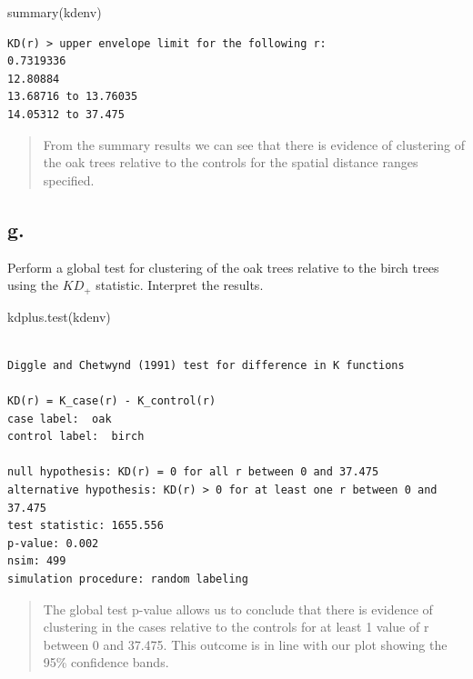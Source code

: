 \documentclass[
  letterpaper,
  DIV=11,
  numbers=noendperiod]{scrartcl}
\newenvironment{Shaded}{\begin{snugshade}}{\end{snugshade}}
\newcommand{\FunctionTok}[1]{\textcolor[rgb]{0.28,0.35,0.67}{#1}}
\newcommand{\NormalTok}[1]{\textcolor[rgb]{0.00,0.23,0.31}{#1}}
\begin{document}
\begin{Shaded}
\begin{Highlighting}[]
\FunctionTok{summary}\NormalTok{(kdenv)}
\end{Highlighting}
\end{Shaded}

\begin{verbatim}
KD(r) > upper envelope limit for the following r:
0.7319336 
12.80884 
13.68716 to 13.76035 
14.05312 to 37.475 
\end{verbatim}

\begin{quote}
From the summary results we can see that there is evidence of clustering
of the oak trees relative to the controls for the spatial distance
ranges specified.
\end{quote}

\hypertarget{g.}{%
\subsection{g.}\label{g.}}

Perform a global test for clustering of the oak trees relative to the
birch trees using the \(KD_+\) statistic. Interpret the results.

\begin{Shaded}
\begin{Highlighting}[]
\FunctionTok{kdplus.test}\NormalTok{(kdenv)}
\end{Highlighting}
\end{Shaded}

\begin{verbatim}

Diggle and Chetwynd (1991) test for difference in K functions

KD(r) = K_case(r) - K_control(r)
case label:  oak 
control label:  birch 

null hypothesis: KD(r) = 0 for all r between 0 and 37.475 
alternative hypothesis: KD(r) > 0 for at least one r between 0 and 37.475 
test statistic: 1655.556 
p-value: 0.002 
nsim: 499 
simulation procedure: random labeling
\end{verbatim}

\begin{quote}
The global test p-value allows us to conclude that there is evidence of
clustering in the cases relative to the controls for at least 1 value of
r between 0 and 37.475. This outcome is in line with our plot showing
the 95\% confidence bands.
\end{quote}
\end{document}

